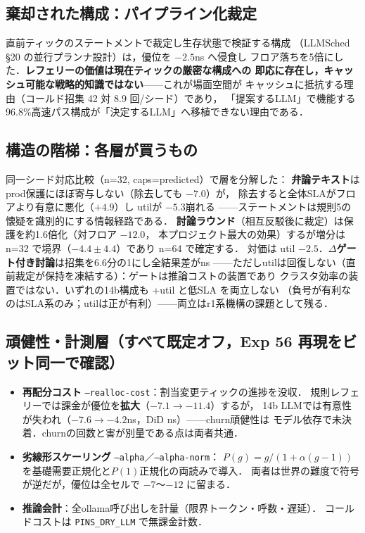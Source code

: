 \subsection{棄却された構成：パイプライン化裁定}
直前ティックのステートメントで裁定し生存状態で検証する構成
（LLMSched \S20 の並行プランナ設計）は，優位を $-2.5$ns へ侵食し
フロア落ちを5倍にした．\textbf{レフェリーの価値は現在ティックの厳密な構成への
即応に存在し，キャッシュ可能な戦略的知識ではない}——これが場面空間が
キャッシュに抵抗する理由（コールド招集 42 対 8.9 回/シード）であり，
「提案するLLM」で機能する96.8\%高速パス構成が「決定するLLM」へ移植できない理由である．

\subsection{構造の階梯：各層が買うもの}
同一シード対応比較（n=32, caps=predicted）で層を分解した：
\textbf{弁論テキスト}はprod保護にほぼ寄与しない（除去しても $-7.0$\sig{}）が，
除去すると全体SLAがフロアより有意に悪化（$+4.9$\sig{}）し utilが $-5.3$\sig 崩れる
——ステートメントは規則5の懐疑を識別的にする情報経路である．
\textbf{討論ラウンド}（相互反駁後に裁定）は保護を約1.6倍化（対フロア $-12.0$\sig{}，
本プロジェクト最大の効果）するが増分は n=32 で境界（$-4.4\pm4.4$）であり n=64 で確定する．
対価は util $-2.5$\sig{}．\textbf{$\Delta$ゲート付き討論}は招集を6.6分の1にし全結果差がns
——ただしutilは回復しない（直前裁定が保持を凍結する）：ゲートは推論コストの装置であり
クラスタ効率の装置ではない．いずれの14b構成も +util と低SLA を両立しない
（負号が有利なのはSLA系のみ；utilは正が有利）——両立はr1系機構の課題として残る．

\subsection{頑健性・計測層（すべて既定オフ，Exp 56 再現をビット同一で確認）}
\begin{itemize}
\item \textbf{再配分コスト} \texttt{--realloc-cost}：割当変更ティックの進捗を没収．
  規則レフェリーでは課金が優位を\textbf{拡大}（$-7.1\to-11.4$）するが，
  14b LLMでは有意性が失われ（$-7.6$\sig$\to-4.2$ns，DiD ns）——churn頑健性は
  モデル依存で未決着．churnの回数と害が別量である点は両者共通．
\item \textbf{劣線形スケーリング} \texttt{--alpha}／\texttt{--alpha-norm}：
  $P(g)=g/(1+\alpha(g-1))$ を基礎需要正規化と$P(1)$正規化の両読みで導入．
  両者は世界の難度で符号が逆だが，優位は全セルで $-7$〜$-12$ に留まる．
\item \textbf{推論会計}：全ollama呼び出しを計量（限界トークン・呼数・遅延）．
  コールドコストは \texttt{PINS\_DRY\_LLM} で無課金計数．
\end{itemize}

